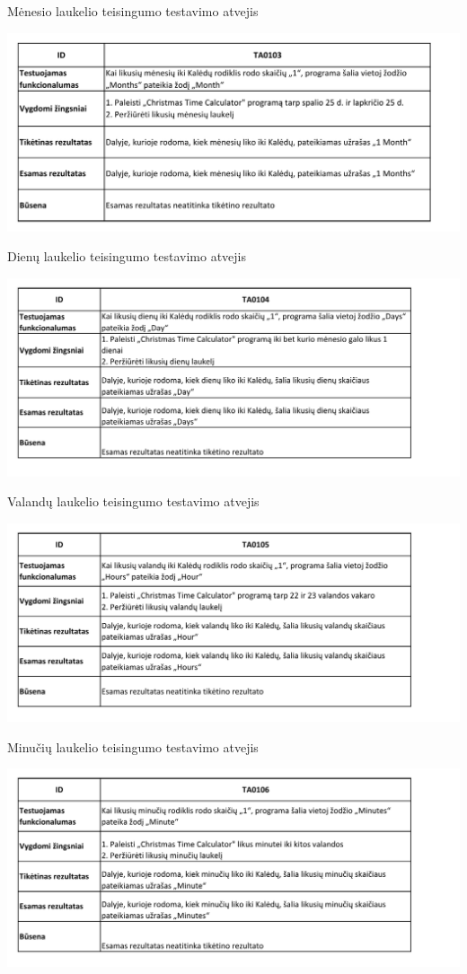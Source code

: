 \documentclass{VUMIFPSkursinis}
\begin{document}
				\begin{table}[H]
					\centering
					\caption{Mėnesio laukelio teisingumo testavimo atvejis}
					\includegraphics[width=\textwidth]{TA/TA0103}			
					\label{fig:TA0103}
				\end{table}
				\begin{table}[H]
					\centering
					\caption{Dienų laukelio teisingumo testavimo atvejis}
					\includegraphics[width=\textwidth]{TA/TA0104}			
					\label{fig:TA0104}
				\end{table}
				\begin{table}[H]
					\centering
					\caption{Valandų laukelio teisingumo testavimo atvejis}
					\includegraphics[width=\textwidth]{TA/TA0105}			
					\label{fig:TA0105}
				\end{table}
				\begin{table}[H]
					\centering
					\caption{Minučių laukelio teisingumo testavimo atvejis}
					\includegraphics[width=\textwidth]{TA/TA0106}			
					\label{fig:TA0106}
				\end{table}
\end{document}
